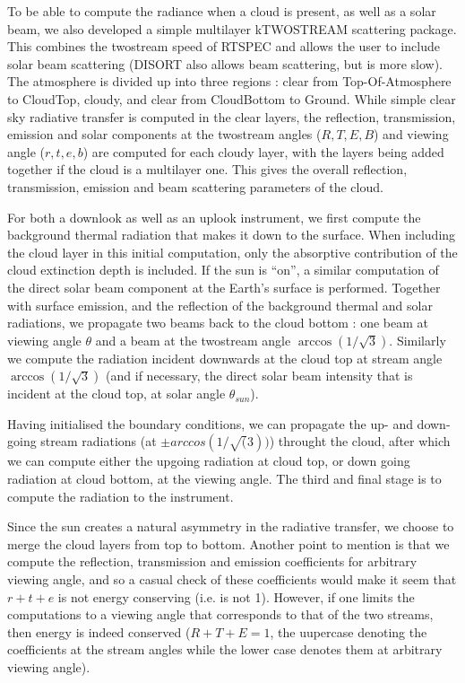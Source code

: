 \documentclass[11pt]{article}
\begin{document}
To be able to compute the radiance when a cloud is present, as well as a 
solar beam, we also developed a simple multilayer \textsf{kTWOSTREAM} 
scattering package. This combines the twostream speed of \textsf{RTSPEC} and 
allows the user to include solar beam scattering (\textsf{DISORT} also allows
beam scattering, but is more slow). The atmosphere is divided up into three 
regions : clear from 
Top-Of-Atmosphere to CloudTop, cloudy, and clear from CloudBottom to Ground.
While simple clear sky radiative transfer is computed in the clear layers, the
reflection, transmission, emission and solar components at the twostream 
angles ($R,T,E,B$) and viewing angle ($r,t,e,b$) are computed for each cloudy
layer, with the layers being added together if the cloud is a multilayer one.
This gives the overall reflection, transmission, emission and beam 
scattering parameters of the cloud.
 
For both a downlook as well as an uplook instrument, we first compute the 
background thermal radiation that makes it down to the surface. 
When including the cloud layer in this initial computation, only the 
absorptive contribution of the cloud extinction depth is included. If the sun
is ``on'', a similar computation of the direct solar beam component at the
Earth's surface is performed. Together with surface emission, and the 
reflection of the background thermal and solar radiations, we propagate two 
beams back to the cloud bottom : one beam at viewing angle $\theta$ and a 
beam at the twostream angle $\arccos(1/\sqrt3)$. Similarly we compute the 
radiation incident downwards at the cloud top at stream angle 
$\arccos(1/\sqrt3)$ (and if necessary, the direct solar beam intensity that 
is incident at the cloud top, at solar angle $\theta_{sun}$). 

Having initialised the boundary conditions, we can propagate the up- and down-
going stream radiations (at $\pm arccos(1/\sqrt(3))$) throught the cloud, 
after which we can compute either the upgoing radiation at cloud top, or down 
going radiation at cloud bottom, at the viewing angle. The third and final 
stage is to compute the radiation to the instrument.

Since the sun creates a natural asymmetry in the radiative transfer, we 
choose to merge the cloud layers from top to bottom. Another point to mention 
is that we compute the reflection, transmission and emission coefficients for 
arbitrary viewing angle, and so a casual check of these coefficients would 
make it seem that $r+t+e$ is not energy conserving (i.e. is not 1). However, 
if one limits the computations to a viewing angle that corresponds to that of 
the two streams, then energy is indeed conserved ($R+T+E = 1$, the uupercase 
denoting the coefficients at the stream angles while the lower case denotes
them at arbitrary viewing angle). 
\end{document}
